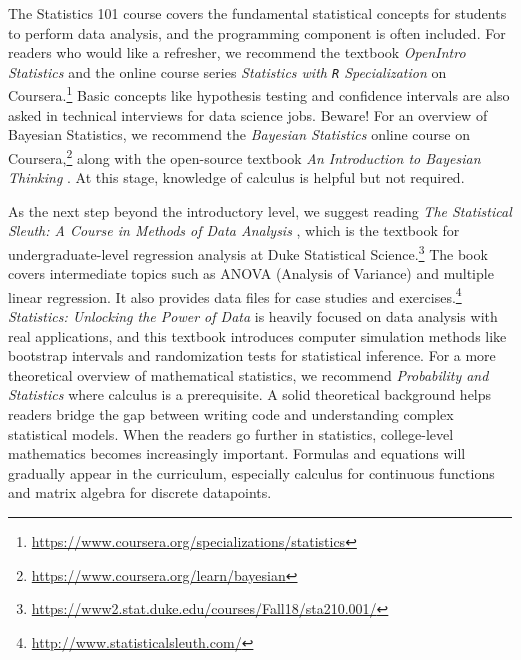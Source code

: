 \documentclass[
]{article}
\begin{document}
The Statistics 101 course covers the fundamental statistical concepts
for students to perform data analysis, and the programming component is
often included. For readers who would like a refresher, we recommend the
textbook \emph{OpenIntro Statistics} \citep{diez2019openintro} and the
online course series \emph{Statistics with \texttt{R} Specialization} on
Coursera.\footnote{\url{https://www.coursera.org/specializations/statistics}}
Basic concepts like hypothesis testing and confidence intervals are also
asked in technical interviews for data science jobs. Beware! For an
overview of Bayesian Statistics, we recommend the \emph{Bayesian
Statistics} online course on Coursera,\footnote{\url{https://www.coursera.org/learn/bayesian}}
along with the open-source textbook \emph{An Introduction to Bayesian
Thinking} \citep{clyde2018bayesian101}. At this stage, knowledge of
calculus is helpful but not required.

As the next step beyond the introductory level, we suggest reading
\emph{The Statistical Sleuth: A Course in Methods of Data Analysis}
\citep{ramsey2013statistical}, which is the textbook for
undergraduate-level regression analysis at Duke Statistical
Science.\footnote{\url{https://www2.stat.duke.edu/courses/Fall18/sta210.001/}}
The book covers intermediate topics such as ANOVA (Analysis of Variance)
and multiple linear regression. It also provides data files for case
studies and exercises.\footnote{\url{http://www.statisticalsleuth.com/}}
\emph{Statistics: Unlocking the Power of Data}
\citep{lock2020statistics} is heavily focused on data analysis with real
applications, and this textbook introduces computer simulation methods
like bootstrap intervals and randomization tests for statistical
inference. For a more theoretical overview of mathematical statistics,
we recommend \emph{Probability and Statistics}
\citep{degroot2012probability} where calculus is a prerequisite. A solid
theoretical background helps readers bridge the gap between writing code
and understanding complex statistical models. When the readers go
further in statistics, college-level mathematics becomes increasingly
important. Formulas and equations will gradually appear in the
curriculum, especially calculus for continuous functions and matrix
algebra for discrete datapoints.
\end{document}
